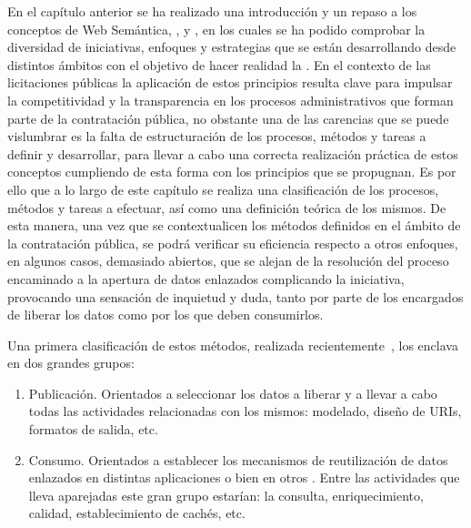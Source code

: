 En el capítulo anterior se ha realizado una introducción y un repaso a los conceptos
de  Web Semántica, \opendata, \linkeddata y \lod, en los cuales se ha podido comprobar
la diversidad de iniciativas, enfoques y estrategias que se están desarrollando desde distintos ámbitos 
con el objetivo de hacer realidad la \wod. En el contexto
de las licitaciones públicas la aplicación de estos principios resulta clave para impulsar
la competitividad y la transparencia en los procesos administrativos que forman parte
de la contratación pública, no obstante una de las carencias que se puede vislumbrar
es la falta de estructuración de los procesos, métodos y tareas a definir
y desarrollar, para llevar a cabo una correcta realización práctica de estos conceptos
cumpliendo de esta forma con los principios que se propugnan. Es por ello que a lo largo de este capítulo se realiza una clasificación de los procesos, métodos y tareas
a efectuar, así como una definición teórica de los mismos. De esta manera,
una vez que se contextualicen los métodos definidos en el ámbito de la contratación pública, se podrá verificar su eficiencia respecto
a otros enfoques, en algunos casos, demasiado abiertos, que se alejan de la resolución del proceso 
encaminado a la apertura de datos enlazados complicando la iniciativa, provocando una sensación
de inquietud y duda, tanto por parte de los encargados de liberar los datos como 
por los que deben consumirlos.

Una primera clasificación de estos métodos, realizada recientemente~\cite{cold}, los enclava en dos grandes grupos:
\begin{enumerate}
 \item Publicación. Orientados a seleccionar los datos a liberar y a llevar a cabo
todas las actividades relacionadas con los mismos: modelado, diseño de URIs, formatos
de salida, etc.
 \item Consumo. Orientados a establecer los mecanismos de reutilización de datos enlazados
en distintas aplicaciones o bien en otros \datasets. Entre las actividades que lleva aparejadas
este gran grupo estarían: la consulta, enriquecimiento, calidad, establecimiento de cachés, etc.
\end{enumerate}

